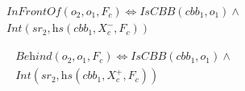 \documentclass{article}
\begin{document}
\begin{multline}
\textit{InFrontOf}(o_2,o_1,F_c)  \Leftrightarrow \textit{IsCBB}(cbb_1,o_1) \wedge \\ \textit{Int}(\textit{sr}_2,
 \textit{hs}(cbb_1,X_{c}^{-},F_c))    
\end{multline}

\begin{multline}
 \textit{Behind}(o_2,o_1,F_c)  \Leftrightarrow \textit{IsCBB}(cbb_1,o_1) \wedge \\ \textit{Int}(\textit{sr}_2,
 \textit{hs}(cbb_1,X_{c}^{+},F_c))   
\end{multline}
\begin{comment}
\subsubsection{Supplementary Material}
Authors may optionally provide supplementary material (e.g. proof details, additional experimental results)
as a separate file. Such material will be consulted at the discretion of reviewers and will not be published.
Please refer to the KR2021website\footnote{\url{https://kr2021.kbsg.rwth-aachen.de/page/call_for_papers}}
for further information.

\section{Formulas}

KR's two-column format makes it difficult to typeset long formulas. A usual
temptation is to reduce the size of the formula by using the \texttt{small} or
\texttt{tiny} sizes. This doesn't work correctly with the current \LaTeX{}
versions, 

Reducing formula sizes this way is strictly forbidden. We \textbf{strongly}
recommend authors to split formulas in multiple lines when they don't fit in a
single line. This is the easiest approach to typeset those formulas and
provides the most readable output%
%
\begin{align}
    x =& \prod_{i=1}^n \sum_{j=1}^n j_i + \prod_{i=1}^n \sum_{j=1}^n i_j + \prod_{i=1}^n \sum_{j=1}^n j_i + \prod_{i=1}^n \sum_{j=1}^n i_j + \nonumber\\
    + & \prod_{i=1}^n \sum_{j=1}^n j_i
\end{align}%


\end{comment}
\end{document}
